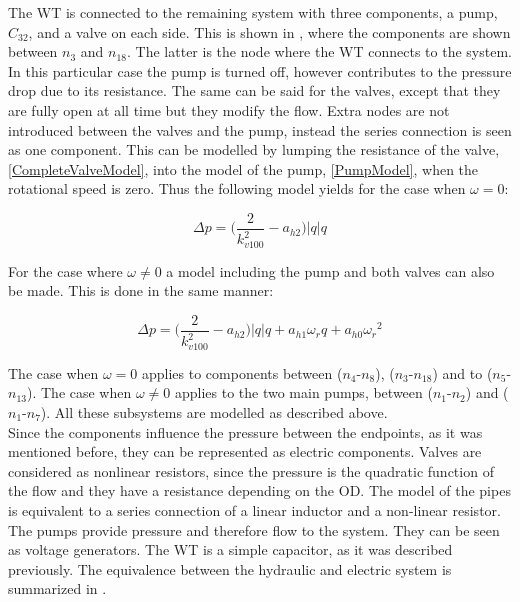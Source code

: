 The WT is connected to the remaining system with three components, a pump, $C_{32}$, and a valve on each side. This is shown in , where the components are shown between $n_3$ and $n_{18}$. 
The latter is the node where the WT connects to the system. In this particular case the pump is turned off, however contributes to the pressure drop due to its resistance. The same can be said for the valves, except that they are fully open at all time but they modify the flow. Extra nodes are not introduced between the valves and the pump, instead the series connection is seen as one component. This can be modelled by lumping the resistance of the valve, \eqref{CompleteValveModel}, into the model of the pump, \eqref{PumpModel}, when the rotational speed is zero. Thus the following model yields for the case when $\omega = 0$:

\begin{equation}
  \Delta p = \Big(\frac{2}{k_{v100}^2} - a_{h2}\Big)|q| q 
  \label{omega_zero}
\end{equation}

For the case where $\omega \neq 0$ a model including the pump and both valves can also be made. This is done in the same manner: 

\begin{equation}
  \Delta p = \Big(\frac{2}{k_{v100}^2} - a_{h2}\Big)|q| q  + a_{h1} \omega_r q + a_{h0}{\omega_r}^2
  \label{omega_notzero}
\end{equation}

The case when $\omega = 0$ applies to components between ($n_4$-$n_8$), ($n_3$-$n_{18}$)  and to ($n_5$-$n_{13}$). The case when $\omega \neq 0$ applies to the two main pumps, between ($n_1$-$n_2$) and ($n_1$-$n_7$). All these subsystems are modelled as described above. 
\\
Since the components influence the pressure between the endpoints, as it was mentioned before, they can be represented as electric components. Valves are considered as nonlinear resistors, since the pressure is the quadratic function of the flow and they have a resistance depending on the OD. The model of the pipes is equivalent to a series connection of a linear inductor and a non-linear resistor. %
The pumps provide pressure and therefore flow to the system. They can be seen as voltage generators. The WT is a simple capacitor, as it was described previously. The equivalence between the hydraulic and electric system is summarized in .

